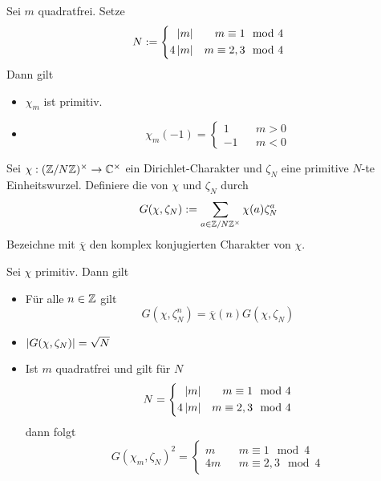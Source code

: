 \Lem{}
Sei $m$ quadratfrei. Setze
\begin{align*}
N := 
\left\lbrace\begin{aligned}
\left|m\right| && m \equiv 1 \mod{4}\\
4\left|m\right| && m \equiv 2,3 \mod{4}
\end{aligned}\right.
\end{align*}
Dann gilt
\begin{itemize}
\item $\chi_m$ ist primitiv.
\item 
\[ \chi_m(-1) = \left\lbrace
\begin{aligned}
1 && m > 0\\
-1 && m < 0
\end{aligned}
\right. \]
\end{itemize}

Sei $\chi : (\mathbb{Z}/N\mathbb{Z})^\times \overset{}{\rightarrow} \mathbb{C}^\times$ ein Dirichlet-Charakter und $\zeta_N$ eine primitive $N$-te Einheitswurzel. Definiere die  von $\chi$ und $\zeta_N$ durch
\[ G(\chi, \zeta_N) := \sum_{a \in \mathbb{Z}/N\mathbb{Z}^\times} \chi(a) \zeta_N^a \]
Bezeichne mit $\overline{\chi}$ den komplex konjugierten Charakter von $\chi$.

\Satz{}
Sei $\chi$ primitiv. Dann gilt
\begin{itemize}
\item Für alle $n \in \mathbb{Z}$ gilt
\[G(\chi, \zeta_N^n) = \overline{\chi}(n) G(\chi, \zeta_N) \]
\item $\left|G(\chi, \zeta_N)\right| = \sqrt{N}$
\item Ist $m$ quadratfrei und gilt für $N$
\begin{align*}
N = 
\left\lbrace\begin{aligned}
\left|m\right| && m \equiv 1 \mod{4}\\
4\left|m\right| && m \equiv 2,3 \mod{4}
\end{aligned}\right.
\end{align*}
dann folgt
\[ G(\chi_m, \zeta_N)^2 = \left\lbrace
\begin{aligned}
m && m \equiv 1 \mod{4}\\
4m && m \equiv 2,3 \mod{4}
\end{aligned}
\right. \]
\end{itemize}

